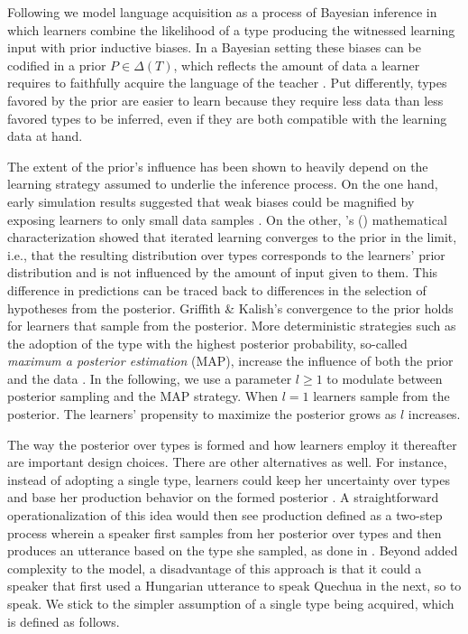\documentclass[a4paper, 11pt]{article}
\theoremstyle{Satz}
\newcommand{\citeposs}[2][]{\citeauthor{#2}'s (\citeyear[#1]{#2})}
\begin{document}
Following \citet{griffiths+kalish:2005,griffiths+kalish:2007} we model language acquisition as a process of Bayesian
inference in which learners combine the likelihood of a type producing the witnessed learning
input with prior inductive biases. In a Bayesian setting these biases can be codified in a prior
$P \in \Delta(T)$, which reflects the amount of data a learner requires to faithfully acquire
the language of the teacher \citep[cf.][450]{griffiths+kalish:2007}. Put differently, types favored by the prior are easier to learn because they require less data than less favored types to be inferred, even if they are both compatible with the learning data at hand. 

The extent of the prior's
influence has been shown to heavily depend on the learning strategy assumed to underlie the
inference process. On the one hand, early simulation results suggested that weak biases could
be magnified by exposing learners to only small data samples
\citep[e.g. in][]{brighton:2002}. On the other, \citeposs{griffiths+kalish:2007} mathematical
characterization showed that iterated learning converges to the prior in the limit, i.e., that
the resulting distribution over types corresponds to the learners' prior distribution and
is not influenced by the amount of input given to them. This difference in predictions can be
traced back to differences in the selection of hypotheses from the posterior. Griffith \&
Kalish's convergence to the prior holds for learners that sample from the posterior. More
deterministic strategies such as the adoption of the type with the highest posterior
probability, so-called {\it maximum a posterior estimation} (MAP), increase the influence of
both the prior and the data \citep{griffiths+kalish:2007,kirby+etal:2007}. In the following, we
use a parameter $l\ge1$ to modulate between posterior sampling and the MAP strategy. When
$l = 1$ learners sample from the posterior. The learners' propensity to maximize the posterior
grows as $l$ increases. 

The way the posterior over types is formed and how learners employ it thereafter are important design choices. There are other alternatives as well. For instance, instead of adopting a single type, learners could keep her uncertainty over types and base her production behavior on the formed posterior \citep{burkett+griffiths:2010}. A straightforward operationalization of this idea would then see production defined as a two-step process wherein a speaker first samples from her posterior over types and then produces an utterance based on the type she sampled, as done in \citep{kirby+etal:2015}. Beyond added complexity to the model, a disadvantage of this approach is that it could a speaker that first used a Hungarian utterance to speak Quechua in the next, so to speak. We stick to the simpler assumption of a single type being acquired, which is defined as follows.
\end{document}
